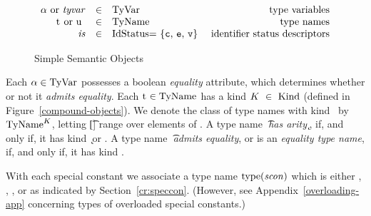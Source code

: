 \vspace{-7mm}
\begin{figure}[h]
\vspace{2pt}
\begin{displaymath}
\begin{array}{rclr}
\alpha\ {\rm or}\ \tyvar & \in   & \TyVar	& \mbox{type variables}\\
\t\ {\rm or}\ \u\               & \in   & \TyName	& \mbox{type names}\\
\is               & \in   & $\IdStatus = \{\cstatus, \estatus, \vstatus\} $
                         &  \mbox{identifier status descriptors}\\
\end{array}
\end{displaymath}
\caption{Simple Semantic Objects}
\label{simple-objects}
\end{figure}

Each $\alpha \in\TyVar$ possesses a boolean {\sl equality} attribute,
which determines whether or not it {\sl admits equality}.
Each $\t\in\TyName$ has
a kind  $\K\ \in\ \Kind$ (defined
in Figure~\ref{compound-objects}). 
We denote the class of type names with kind \K\ by $\TyName[\K]$, letting
\t[\K] range over elements of \TyName[\K]. 
A type name \t\ {\sl has arity \k}, if, and only if, it has kind \k\ or \keq.
A type name \t\ {\sl admits equality}, or is an {\sl equality type name}, if, and only if, it has kind \keq.



With each special constant {\scon} we associate a type
name $\scontype(\scon)$ which is either {\INT}, {\REAL}, {\WORD}, {\CHAR}
or {\STRING}
as indicated by Section~\ref{cr:speccon}.
(However, see Appendix~\ref{overloading-app} concerning types of overloaded special constants.)

